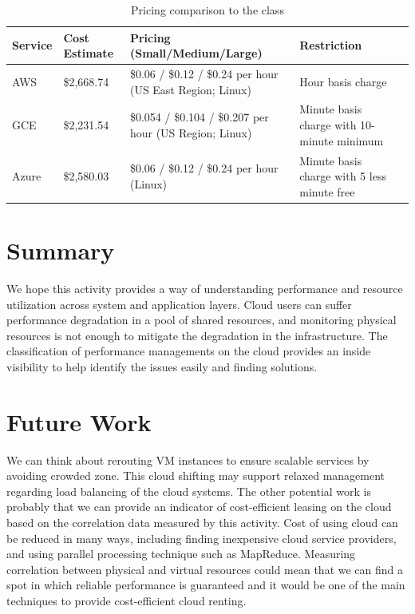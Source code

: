 \documentclass{sig-alternate}
\begin{document}

\begin{table}[h!]
\caption{Pricing comparison to the class}\label{T:tab2}
\begin{tabular}{l|l|l|l|l}
Service & Cost Estimate & Pricing (Small/Medium/Large) & Restriction \\
 \hline
AWS & \$2,668.74  & \$0.06 / \$0.12 / \$0.24 per hour (US East Region; Linux) & Hour basis charge\\
GCE & \$2,231.54  & \$0.054 / \$0.104 / \$0.207 per hour (US Region; Linux) & Minute basis charge with 10-minute minimum\\
Azure & \$2,580.03  & \$0.06 / \$0.12 / \$0.24 per hour (Linux) & Minute basis charge with 5 less minute free\\
\end{tabular}
\end{table}


\section{Summary}

We hope this activity provides a way of understanding performance and resource utilization across system and application layers. Cloud users can suffer performance degradation in a pool of shared resources, and monitoring physical resources is not enough to mitigate the degradation in the infrastructure. The classification of performance managements on the cloud provides an inside visibility to help identify the issues easily and finding solutions.

\section{Future Work}

We can think about rerouting VM instances to ensure scalable services by avoiding crowded zone. This cloud shifting may support relaxed management regarding load balancing of the cloud systems. The other potential work is probably that we can provide an indicator of cost-efficient leasing on the cloud based on the correlation data measured by this activity. Cost of using cloud can be reduced in many ways, including finding inexpensive cloud service providers, and using parallel processing technique such as MapReduce. Measuring correlation between physical and virtual resources could mean that we can find a spot in which reliable performance is guaranteed and it would be one of the main techniques to provide cost-efficient cloud renting.
\end{document}
